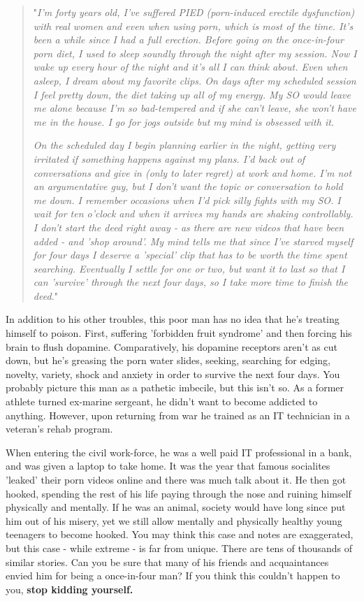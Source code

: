 \documentclass[
]{book}
\begin{document}
\begin{quote}
"\emph{I'm forty years old, I've suffered PIED (porn-induced erectile dysfunction) with real women and even when using porn, which is most of the time. It's been a while since I had a full erection. Before going on the once-in-four porn diet, I used to sleep soundly through the night after my session. Now I wake up every hour of the night and it's all I can think about. Even when asleep, I dream about my favorite clips. On days after my scheduled session I feel pretty down, the diet taking up all of my energy. My SO would leave me alone because I'm so bad-tempered and if she can't leave, she won't have me in the house. I go for jogs outside but my mind is obsessed with it.}

\emph{On the scheduled day I begin planning earlier in the night, getting very irritated if something happens against my plans. I'd back out of conversations and give in (only to later regret) at work and home. I'm not an argumentative guy, but I don't want the topic or conversation to hold me down. I remember occasions when I'd pick silly fights with my SO. I wait for ten o'clock and when it arrives my hands are shaking controllably. I don't start the deed right away - as there are new videos that have been added - and 'shop around'. My mind tells me that since I've starved myself for four days I deserve a 'special' clip that has to be worth the time spent searching. Eventually I settle for one or two, but want it to last so that I can 'survive' through the next four days, so I take more time to finish the deed.}"
\end{quote}

In addition to his other troubles, this poor man has no idea that he's treating himself to poison. First, suffering 'forbidden fruit syndrome' and then forcing his brain to flush dopamine. Comparatively, his dopamine receptors aren't as cut down, but he's greasing the porn water slides, seeking, searching for edging, novelty, variety, shock and anxiety in order to survive the next four days. You probably picture this man as a pathetic imbecile, but this isn't so. As a former athlete turned ex-marine sergeant, he didn't want to become addicted to anything. However, upon returning from war he trained as an IT technician in a veteran's rehab program.

When entering the civil work-force, he was a well paid IT professional in a bank, and was given a laptop to take home. It was the year that famous socialites 'leaked' their porn videos online and there was much talk about it. He then got hooked, spending the rest of his life paying through the nose and ruining himself physically and mentally. If he was an animal, society would have long since put him out of his misery, yet we still allow mentally and physically healthy young teenagers to become hooked. You may think this case and notes are exaggerated, but this case - while extreme - is far from unique. There are tens of thousands of similar stories. Can you be sure that many of his friends and acquaintances envied him for being a once-in-four man? If you think this couldn't happen to you, \textbf{stop kidding yourself.}
\end{document}
